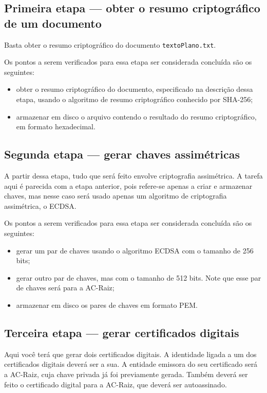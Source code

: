 \documentclass{article}
\begin{document}
\subsection{Primeira etapa ---
    obter o resumo criptográfico de um documento}\label{subsec:step1}

Basta obter o resumo criptográfico do documento \texttt{textoPlano.txt}.

Os pontos a serem verificados para essa etapa ser considerada concluída são os
seguintes:

\begin{itemize}
  \item obter o resumo criptográfico do documento, especificado na descrição
      dessa etapa, usando o algoritmo de resumo criptográfico conhecido por
        SHA-256;
  \item armazenar em disco o arquivo contendo o resultado do resumo
      criptográfico, em formato hexadecimal.
\end{itemize}

\subsection{Segunda etapa --- gerar chaves assimétricas}\label{subsec:step2}

A partir dessa etapa, tudo que será feito envolve criptografia assimétrica. A
tarefa aqui é parecida com a etapa anterior, pois refere-se apenas a criar e
armazenar chaves, mas nesse caso será usado apenas um algoritmo de criptografia
assimétrica, o ECDSA\@.

Os pontos a serem verificados para essa etapa ser considerada concluída são os
seguintes:

\begin{itemize}
  \item gerar um par de chaves usando o algoritmo ECDSA com o tamanho de 256
      bits;
  \item gerar outro par de chaves, mas com o tamanho de 512 bits. Note que esse
      par de chaves será para a AC-Raiz;
  \item armazenar em disco os pares de chaves em formato PEM.
\end{itemize}

\subsection{Terceira etapa --- gerar certificados digitais}\label{subsec:step3}

Aqui você terá que gerar dois certificados digitais. A identidade ligada a um
dos certificados digitais deverá ser a sua. A entidade emissora do seu
certificado será a AC-Raiz, cuja chave privada já foi previamente gerada.
Também deverá ser feito o certificado digital para a AC-Raiz, que deverá ser
autoassinado.
\end{document}
